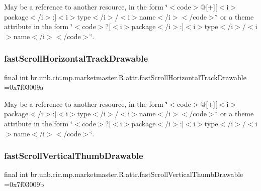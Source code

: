 May be a reference to another resource, in the form \char`\"{}$<$code$>$@\mbox{[}+\mbox{]}\mbox{[}$<$i$>$package$<$/i$>$\+:\mbox{]}$<$i$>$type$<$/i$>$/$<$i$>$name$<$/i$>$$<$/code$>$\char`\"{} or a theme attribute in the form \char`\"{}$<$code$>$?\mbox{[}$<$i$>$package$<$/i$>$\+:\mbox{]}$<$i$>$type$<$/i$>$/$<$i$>$name$<$/i$>$$<$/code$>$\char`\"{}. \mbox{\label{classbr_1_1unb_1_1cic_1_1mp_1_1marketmaster_1_1R_1_1attr_a79c338302f75ab5ff2906f74038ae3f3}} 
\subsubsection{\texorpdfstring{fast\+Scroll\+Horizontal\+Track\+Drawable}{fastScrollHorizontalTrackDrawable}}
{\footnotesize\ttfamily final int br.\+unb.\+cic.\+mp.\+marketmaster.\+R.\+attr.\+fast\+Scroll\+Horizontal\+Track\+Drawable =0x7f03009a\hspace{0.3cm}{\ttfamily [static]}}

May be a reference to another resource, in the form \char`\"{}$<$code$>$@\mbox{[}+\mbox{]}\mbox{[}$<$i$>$package$<$/i$>$\+:\mbox{]}$<$i$>$type$<$/i$>$/$<$i$>$name$<$/i$>$$<$/code$>$\char`\"{} or a theme attribute in the form \char`\"{}$<$code$>$?\mbox{[}$<$i$>$package$<$/i$>$\+:\mbox{]}$<$i$>$type$<$/i$>$/$<$i$>$name$<$/i$>$$<$/code$>$\char`\"{}. \mbox{\label{classbr_1_1unb_1_1cic_1_1mp_1_1marketmaster_1_1R_1_1attr_af1738e817e24c6db953d3d536c10ada9}} 
\subsubsection{\texorpdfstring{fast\+Scroll\+Vertical\+Thumb\+Drawable}{fastScrollVerticalThumbDrawable}}
{\footnotesize\ttfamily final int br.\+unb.\+cic.\+mp.\+marketmaster.\+R.\+attr.\+fast\+Scroll\+Vertical\+Thumb\+Drawable =0x7f03009b\hspace{0.3cm}{\ttfamily [static]}}

